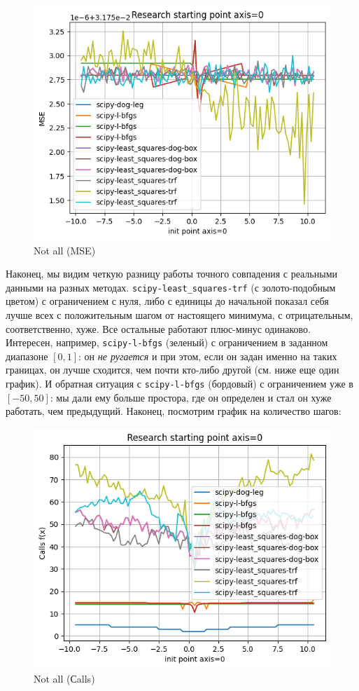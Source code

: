 \documentclass[12pt, a4paper, oneside, final]{article}
\begin{document}
	\begin{figure}[H]
		\centering
		\includegraphics[scale = 1]{Image/T2A_LEAST_NOT_ALL_MSE.png}
		\caption*{Not all (MSE)}
	\end{figure}
	Наконец, мы видим четкую разницу работы точного совпадения с реальными данными на разных методах.
	\texttt{scipy-least\_squares-trf} (с золото-подобным цветом) с ограничением с нуля, либо с единицы до начальной показал себя лучше всех с положительным шагом от настоящего минимума, с отрицательным, соответственно, хуже.
	Все остальные работают плюс-минус одинаково.
	Интересен, например, \texttt{scipy-l-bfgs} (зеленый) с ограничением в заданном диапазоне $[0, 1]$: он \textit{не ругается} и при этом, если он задан именно на таких границах, он лучше сходится, чем почти кто-либо другой (см. ниже еще один график).
	И обратная ситуация с \texttt{scipy-l-bfgs} (бордовый) с ограничением уже в $[-50, 50]$: мы дали ему больше простора, где он определен и стал он хуже работать, чем предыдущий.
	Наконец, посмотрим график на количество шагов:
	\begin{figure}[H]
		\centering
		\includegraphics[scale = 1]{Image/T2A_LEAST_NOT_ALL_CALLS.png}
		\caption*{Not all (Сalls)}
	\end{figure}
\end{document}
